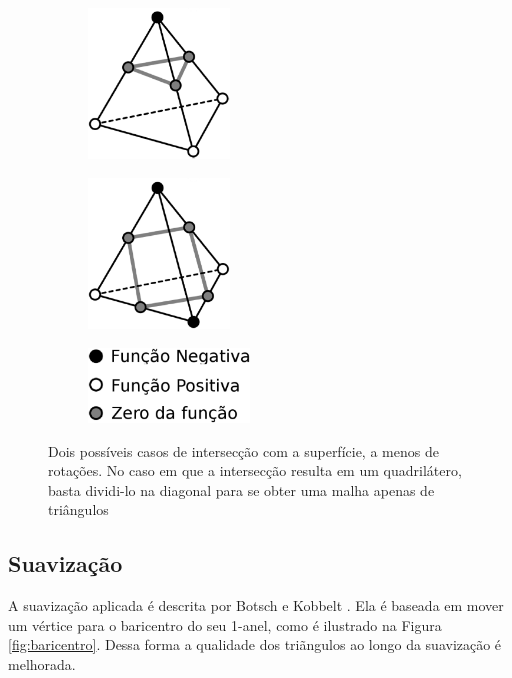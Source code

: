 \documentclass[11pt]{article}
\begin{document}
			\begin{figure}
				\centering
				\begin{subfigure}[b]{0.3\textwidth}
					\centering
					\includegraphics[height=4cm]{figures/tetra01}
				\end{subfigure}
				\begin{subfigure}[b]{0.3\textwidth}
					\centering
					\includegraphics[height=4cm]{figures/tetra02}
				\end{subfigure}
				\begin{subfigure}[b]{0.3\textwidth}
					\centering
					\includegraphics[height=2cm]{figures/tetra03}
				\end{subfigure}
				\caption{Dois possíveis casos de intersecção com a superfície, a menos de rotações. No caso em que a intersecção resulta em um quadrilátero, basta dividi-lo na diagonal para se obter uma malha apenas de triângulos}
				\label{fig:tetras}
			\end{figure}
		\subsection{Suavização} %
		\label{sub:suavizacao}
			A suavização aplicada é descrita por Botsch e Kobbelt \cite{botsch2004}. Ela é baseada em mover um vértice para o baricentro do seu 1-anel, como é ilustrado na Figura \ref{fig:baricentro}. Dessa forma a qualidade dos triãngulos ao longo da suavização é melhorada.
\end{document}
